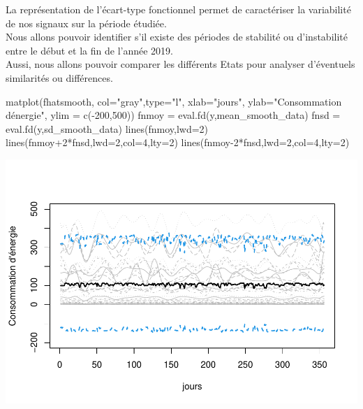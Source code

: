 \documentclass[
]{article}
\newenvironment{Shaded}{\begin{snugshade}}{\end{snugshade}}
\newcommand{\AttributeTok}[1]{\textcolor[rgb]{0.77,0.63,0.00}{#1}}
\newcommand{\DecValTok}[1]{\textcolor[rgb]{0.00,0.00,0.81}{#1}}
\newcommand{\FunctionTok}[1]{\textcolor[rgb]{0.00,0.00,0.00}{#1}}
\newcommand{\NormalTok}[1]{#1}
\newcommand{\OtherTok}[1]{\textcolor[rgb]{0.56,0.35,0.01}{#1}}
\newcommand{\SpecialCharTok}[1]{\textcolor[rgb]{0.00,0.00,0.00}{#1}}
\newcommand{\StringTok}[1]{\textcolor[rgb]{0.31,0.60,0.02}{#1}}
\begin{document}
La représentation de l'écart-type fonctionnel permet de caractériser la
variabilité de nos signaux sur la période étudiée.\\
Nous allons pouvoir identifier s'il existe des périodes de stabilité ou
d'instabilité entre le début et la fin de l'année 2019.\\
Aussi, nous allons pouvoir comparer les différents Etats pour analyser
d'éventuels similarités ou différences.

\begin{Shaded}
\end{Shaded}

\begin{Shaded}
\begin{Highlighting}[]
\FunctionTok{matplot}\NormalTok{(fhatsmooth,}
        \AttributeTok{col=}\StringTok{"gray"}\NormalTok{,}\AttributeTok{type=}\StringTok{"l"}\NormalTok{,}
        \AttributeTok{xlab=}\StringTok{"jours"}\NormalTok{,}
        \AttributeTok{ylab=}\StringTok{"Consommation d\textquotesingle{}énergie"}\NormalTok{,}
        \AttributeTok{ylim =} \FunctionTok{c}\NormalTok{(}\SpecialCharTok{{-}}\DecValTok{200}\NormalTok{,}\DecValTok{500}\NormalTok{))}
\NormalTok{fnmoy }\OtherTok{=} \FunctionTok{eval.fd}\NormalTok{(y,mean\_smooth\_data)}
\NormalTok{fnsd  }\OtherTok{=} \FunctionTok{eval.fd}\NormalTok{(y,sd\_smooth\_data)}
\FunctionTok{lines}\NormalTok{(fnmoy,}\AttributeTok{lwd=}\DecValTok{2}\NormalTok{)}
\FunctionTok{lines}\NormalTok{(fnmoy}\SpecialCharTok{+}\DecValTok{2}\SpecialCharTok{*}\NormalTok{fnsd,}\AttributeTok{lwd=}\DecValTok{2}\NormalTok{,}\AttributeTok{col=}\DecValTok{4}\NormalTok{,}\AttributeTok{lty=}\DecValTok{2}\NormalTok{)}
\FunctionTok{lines}\NormalTok{(fnmoy}\DecValTok{{-}2}\SpecialCharTok{*}\NormalTok{fnsd,}\AttributeTok{lwd=}\DecValTok{2}\NormalTok{,}\AttributeTok{col=}\DecValTok{4}\NormalTok{,}\AttributeTok{lty=}\DecValTok{2}\NormalTok{)}
\end{Highlighting}
\end{Shaded}

\includegraphics{Projet_CHESNAIS_GUIBERT_files/figure-latex/unnamed-chunk-36-1.pdf}
\end{document}
